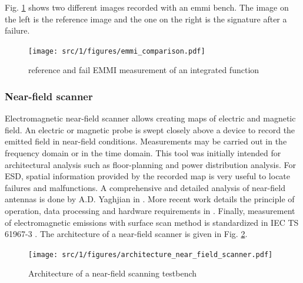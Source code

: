 Fig. \ref{fig:emmi-examples} shows two different images recorded with an \gls{emmi} bench.
The image on the left is the reference image and the one on the right is the signature after a failure.

\begin{figure}[!h]
  \centering
  \texttt{[image: src/1/figures/emmi\_comparison.pdf]}
  \caption{reference and fail EMMI measurement of an integrated function}
  \label{fig:emmi-examples}
\end{figure}

\subsubsection{Near-field scanner}
\label{sec:near-field-scan}

Electromagnetic near-field scanner allows creating maps of electric and magnetic field.
An electric or magnetic probe is swept closely above a device to record the emitted field in near-field conditions.
Measurements may be carried out in the frequency domain or in the time domain.
This tool was initially intended for architectural analysis such as floor-planning and power distribution analysis.
For ESD, spatial information provided by the recorded map is very useful to locate failures and malfunctions.
A comprehensive and detailed analysis of near-field antennas is done by A.D. Yaghjian in \cite{nfsFirstStudy}.
More recent work details the principle of operation, data processing and hardware requirements in \cite{near-field-scan, planarNFSAntenna, NFSMeasurements, NFScanner}.
Finally, measurement of electromagnetic emissions with surface scan method is standardized in IEC TS 61967-3 \cite{iec61967}.
The architecture of a near-field scanner is given in Fig. \ref{fig:near-field-scanner}.

\begin{figure}[!h]
  \centering
  \texttt{[image: src/1/figures/architecture\_near\_field\_scanner.pdf]}
  \caption{Architecture of a near-field scanning testbench}
  \label{fig:near-field-scanner}
\end{figure}



